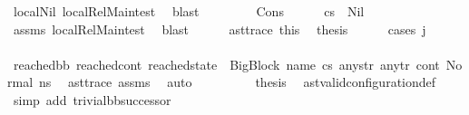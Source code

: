 \begin{isabellebody}
\ local{\isachardot}{\kern0pt}Nil\ local{\isachardot}{\kern0pt}Rel{\isacharunderscore}{\kern0pt}Main{\isacharunderscore}{\kern0pt}test{\isacharparenleft}{\kern0pt}{}{\isacharparenright}{\kern0pt}\ \isamarkupfalse%
\ blast\isanewline
\ \ \isamarkupfalse%
\isanewline
\ \ \ \ \isamarkupfalse%
\ {\isacharparenleft}{\kern0pt}Cons{\isacharparenright}{\kern0pt}\isanewline
\ \ \ \ \isamarkupfalse%
\ {\isachardoublequoteopen}cs{}\ {\isasymnoteq}\ Nil{\isachardoublequoteclose}\ \isamarkupfalse%
\ assms{\isacharparenleft}{\kern0pt}{}{\isacharparenright}{\kern0pt}\ local{\isachardot}{\kern0pt}Rel{\isacharunderscore}{\kern0pt}Main{\isacharunderscore}{\kern0pt}test\ \isamarkupfalse%
\ blast\isanewline
\ \ \ \ \isamarkupfalse%
\ ast{\isacharunderscore}{\kern0pt}trace\ this\ \isamarkupfalse%
\ {\isacharquery}{\kern0pt}thesis\isanewline
\ \ \ \ \isamarkupfalse%
\ {\isacharparenleft}{\kern0pt}cases\ j{\isacharparenright}{\kern0pt}\isanewline
\ \ \ \ \ \ \isamarkupfalse%
\ {}\isanewline
\ \ \ \ \ \ \isamarkupfalse%
\ {\isachardoublequoteopen}{\isacharparenleft}{\kern0pt}reached{\isacharunderscore}{\kern0pt}bb{\isacharcomma}{\kern0pt}\ reached{\isacharunderscore}{\kern0pt}cont{\isacharcomma}{\kern0pt}\ reached{\isacharunderscore}{\kern0pt}state{\isacharparenright}{\kern0pt}\ {\isacharequal}{\kern0pt}\ {\isacharparenleft}{\kern0pt}{\isacharparenleft}{\kern0pt}BigBlock\ name\ cs{}\ any{\isacharunderscore}{\kern0pt}str\ any{\isacharunderscore}{\kern0pt}tr{\isacharparenright}{\kern0pt}{\isacharcomma}{\kern0pt}\ cont{}{\isacharcomma}{\kern0pt}\ {\isacharparenleft}{\kern0pt}Normal\ ns{}{\isacharparenright}{\kern0pt}{\isacharparenright}{\kern0pt}{\isachardoublequoteclose}\ \isamarkupfalse%
\ ast{\isacharunderscore}{\kern0pt}trace\ assms{\isacharparenleft}{\kern0pt}{}{\isacharparenright}{\kern0pt}\ \isamarkupfalse%
\ auto\isanewline
\ \ \ \ \ \ \isamarkupfalse%
\ \isamarkupfalse%
\ {\isacharquery}{\kern0pt}thesis\ \isamarkupfalse%
\ ast{\isacharunderscore}{\kern0pt}valid{\isacharunderscore}{\kern0pt}configuration{\isacharunderscore}{\kern0pt}def\ \isamarkupfalse%
\ {\isacharparenleft}{\kern0pt}simp\ add{\isacharcolon}{\kern0pt}\ trivial{\isacharunderscore}{\kern0pt}bb{\isacharunderscore}{\kern0pt}successor{\isacharparenright}{\kern0pt}\isanewline

\end{isabellebody}
